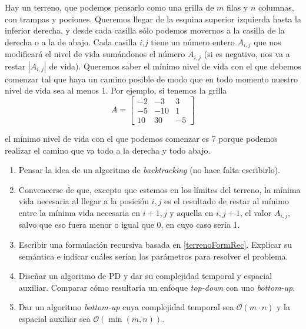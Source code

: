 

\item Hay un terreno, que podemos pensarlo como una grilla de $m$ filas y $n$ columnas, con trampas y pociones. Queremos llegar de la esquina superior izquierda hasta la inferior derecha, y desde cada casilla sólo podemos movernos a la casilla de la derecha o a la de abajo. Cada casilla $i$,$j$ tiene un número entero $A_{i,j}$ que nos modificará el nivel de vida sumándonos el número $A_{i,j}$ (si es negativo, nos va a restar $|A_{i,j}|$ de vida). Queremos saber el mínimo nivel de vida con el que debemos comenzar tal que haya un camino posible de modo que en todo momento nuestro nivel de vida sea al menos 1. Por ejemplo, si tenemos la grilla
\[ A = \begin{bmatrix}
-2 & -3 & 3 \\
-5 & -10 & 1 \\
10 & 30 & -5
\end{bmatrix} \]
\par{el mínimo nivel de vida con el que podemos comenzar es 7 porque podemos realizar el camino que va todo a la derecha y todo abajo.}
\begin{enumerate}[label=$\alph*)$,ref=$\alph*)$]
\item Pensar la idea de un algoritmo de \textit{backtracking} (no hace falta escribirlo).
\item Convencerse de que, excepto que estemos en los límites del terreno, la mínima vida necesaria al llegar a la posición $i, j$ es el resultado de restar al mínimo entre la mínima vida necesaria en $i+1, j$ y aquella en $i, j+1$, el valor $A_{i,j}$, salvo que eso fuera menor o igual que 0, en cuyo caso sería 1.
\label{terrenoFormRec}
\item Escribir una formulación recursiva basada en \ref{terrenoFormRec}. Explicar su semántica e indicar cuáles serían los parámetros para resolver el problema.
\item Diseñar un algoritmo de PD y dar su complejidad temporal y espacial auxiliar. Comparar cómo resultaría un enfoque \textit{top-down} con uno \textit{bottom-up}.
\item Dar un algoritmo \textit{bottom-up} cuya complejidad temporal sea $\mathcal{O}(m \cdot n)$ y la espacial auxiliar sea $\mathcal{O}(\min(m, n))$.
\end{enumerate}

